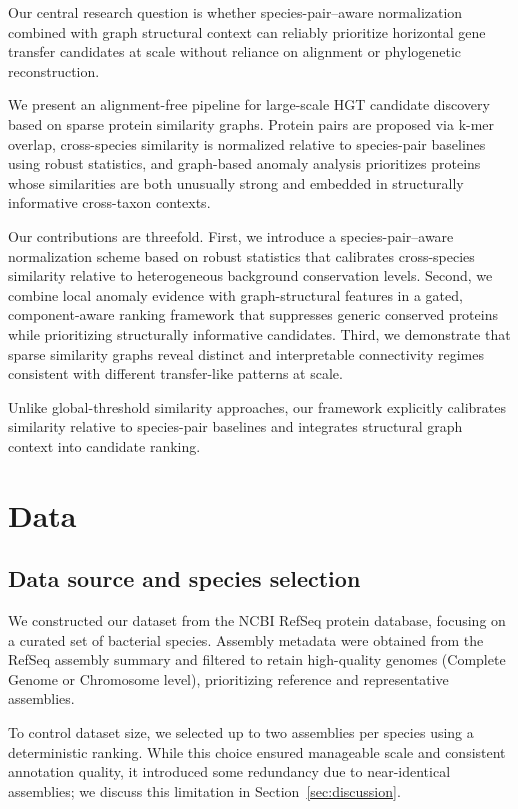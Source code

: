 \documentclass[11pt]{article}
\begin{document}
Our central research question is whether species-pair–aware normalization combined with graph structural context can reliably prioritize horizontal gene transfer candidates at scale without reliance on alignment or phylogenetic reconstruction.

We present an alignment-free pipeline for large-scale HGT candidate discovery based on sparse
protein similarity graphs. Protein pairs are proposed via k-mer overlap, cross-species similarity is normalized relative to species-pair baselines using robust statistics, and graph-based anomaly analysis prioritizes proteins whose similarities are both unusually strong and embedded in structurally informative cross-taxon contexts.

Our contributions are threefold. First, we introduce a species-pair–aware normalization scheme
based on robust statistics that calibrates cross-species similarity relative to heterogeneous
background conservation levels. Second, we combine local anomaly evidence with graph-structural
features in a gated, component-aware ranking framework that suppresses generic conserved
proteins while prioritizing structurally informative candidates. Third, we demonstrate that sparse similarity graphs reveal distinct and interpretable connectivity regimes consistent with different transfer-like patterns at scale.

Unlike global-threshold similarity approaches, our framework explicitly calibrates similarity
relative to species-pair baselines and integrates structural graph context into candidate ranking.


\section{Data}

\subsection{Data source and species selection}
We constructed our dataset from the NCBI RefSeq protein database, focusing on a curated set of bacterial species. Assembly metadata were obtained from the RefSeq assembly summary and filtered to retain high-quality genomes (Complete Genome or Chromosome level), prioritizing reference and representative assemblies.

To control dataset size, we selected up to two assemblies per species using a deterministic ranking. While this choice ensured manageable scale and consistent annotation quality, it introduced some redundancy due to near-identical assemblies; we discuss this limitation in Section~\ref{sec:discussion}.
\end{document}
